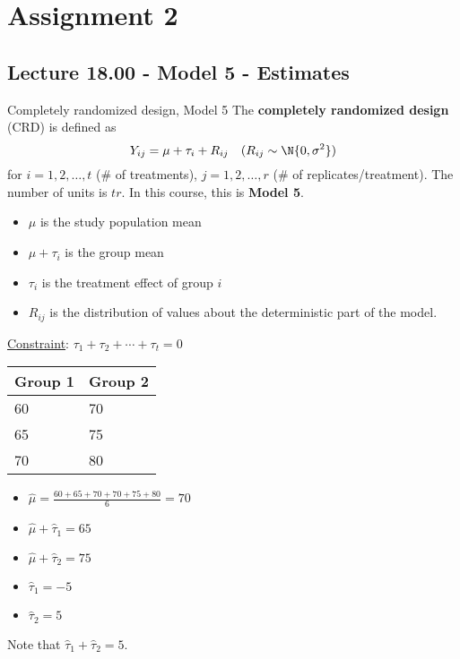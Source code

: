 \chapter{Assignment 2}
\section{Lecture 18.00 - Model 5 - Estimates}
\begin{Definition}{Completely randomized design, Model 5}{}
    The \textbf{completely randomized design} (CRD) is defined as
    \[ Y_{ij}=\mu+\tau_i+R_{ij}\quad(R_{ij}\sim \N{0,\sigma^2}) \]
    for $ i=1,2,\ldots,t $ (\# of treatments),
    $ j=1,2,\ldots,r $ (\# of replicates/treatment).
    The number of units is $ tr $. In this course,
    this is \textbf{Model 5}.
    \begin{itemize}
        \item $ \mu $ is the study population mean
        \item $ \mu+\tau_i $ is the group mean
        \item $ \tau_i $ is the treatment effect of group $ i $
        \item $ R_{ij} $ is the distribution of values about the deterministic
              part of the model.
    \end{itemize}
    \underline{Constraint}: $ \tau_1+\tau_2+\cdots+\tau_t=0 $
\end{Definition}
\begin{Example}{}{}
    \begin{center}
        \begin{tabularx}{0.95\linewidth}{@{}YY@{}}
            Group 1 & Group 2 \\
                  & 70      \\
            65      & 75      \\
            70      & 80      \\
        \end{tabularx}
    \end{center}
    \begin{itemize}
        \item $ \hat{\mu}=\frac{60+65+70+70+75+80}{6} =70 $
        \item $ \hat{\mu}+\hat{\tau}_1=65 $
        \item $ \hat{\mu}+\hat{\tau}_2=75 $
        \item $ \hat{\tau}_1=-5 $
        \item $ \hat{\tau}_2=5 $
    \end{itemize}
    Note that $ \hat{\tau}_1+\hat{\tau}_2=5 $.
\end{Example}
